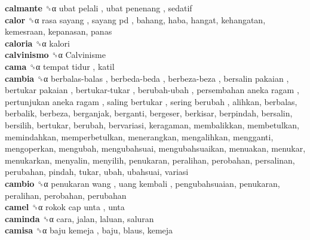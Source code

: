 \textbf{calmante} ␝α   ubat pelali ,  ubat penenang , sedatif  \\
\textbf{calor} ␝α   rasa sayang ,  sayang pd , bahang, haba, hangat, kehangatan, kemesraan, kepanasan, panas  \\
\textbf{caloria} ␝α  kalori  \\
\textbf{calvinismo} ␝α   Calvinisme   \\
\textbf{cama} ␝α   tempat tidur , katil  \\
\textbf{cambia} ␝α   berbalas-balas ,  berbeda-beda ,  berbeza-beza ,  bersalin pakaian ,  bertukar pakaian ,  bertukar-tukar ,  berubah-ubah ,  persembahan aneka ragam ,  pertunjukan aneka ragam ,  saling bertukar ,  sering berubah , alihkan, berbalas, berbalik, berbeza, berganjak, berganti, bergeser, berkisar, berpindah, bersalin, bersilih, bertukar, berubah, bervariasi, keragaman, membalikkan, membetulkan, memindahkan, memperbetulkan, menerangkan, mengalihkan, mengganti, mengoperkan, mengubah, mengubahsuai, mengubahsuaikan, menuakan, menukar, menukarkan, menyalin, menyilih, penukaran, peralihan, perobahan, persalinan, perubahan, pindah, tukar, ubah, ubahsuai, variasi  \\
\textbf{cambio} ␝α   penukaran wang ,  uang kembali , pengubahsuaian, penukaran, peralihan, perobahan, perubahan  \\
\textbf{camel} ␝α   rokok cap unta , unta  \\
\textbf{caminda} ␝α  cara, jalan, laluan, saluran  \\
\textbf{camisa} ␝α   baju kemeja , baju, blaus, kemeja  \\
